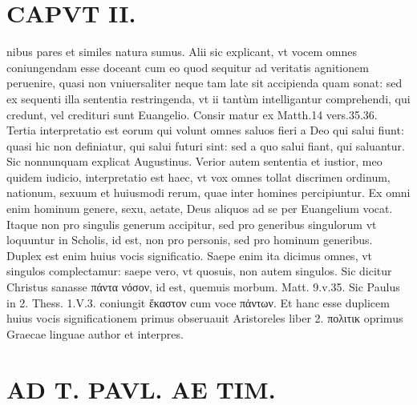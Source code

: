 \documentclass{article}
\begin{document}
\begin{pages}
\section*{CAPVT II. }
\marginpar{[ p.55 ]}\pstart nibus pares et similes natura sumus. Alii sic explicant, vt vocem omnes coniungendam esse doceant cum eo quod sequitur ad veritatis agnitionem peruenire, quasi non vniuersaliter neque tam late sit accipienda quam sonat: sed ex sequenti illa sententia restringenda, vt ii tantùm intelligantur comprehendi, qui credunt, vel credituri sunt Euangelio. Consir matur ex Matth.14 vers.35.36.  \pend\pstart Tertia interpretatio est eorum qui volunt omnes saluos fieri a Deo qui salui fiunt: quasi hic non definiatur, qui salui futuri sint: sed a quo salui fiant, qui saluantur. Sic nonnunquam explicat Augustinus.  \pend\pstart Verior autem sententia et iustior, meo quidem iudicio, interpretatio est haec, vt vox omnes tollat discrimen ordinum, nationum, sexuum et huiusmodi rerum, quae inter homines percipiuntur. Ex omni enim hominum genere, sexu, aetate, Deus aliquos ad se per Euangelium vocat. Itaque  non pro singulis generum accipitur, sed pro generibus singulorum vt loquuntur in Scholis, id est, non pro personis, sed pro hominum generibus.  \pend\pstart Duplex est enim huius vocis significatio. Saepe enim ita dicimus omnes, vt singulos complectamur: saepe vero, vt quosuis, non autem singulos. Sic dicitur Christus sanasse πάντα νόσον, id est, quemuis morbum. Matt. 9.v.35. Sic Paulus in 2. Thess. 1.V.3. coniungit ἕκαστον cum voce πἀντων. Et hanc esse duplicem huius vocis significationem primus obseruauit Aristoreles liber  2. πολιτικ oprimus Graecae linguae author et interpres.  \pend
\section*{AD T. PAVL. AE TIM. }
\marginpar{[ p.56 ]}
{}

\end{pages}
\end{document}

